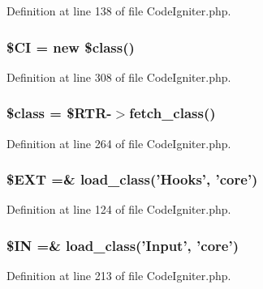 Definition at line 138 of file Code\-Igniter.\-php.

\subsubsection[{\$\-C\-I}]{\setlength{\rightskip}{0pt plus 5cm}\$C\-I = new \$class()}\label{_code_igniter_8php_ae0314d046ddf7fcfaec03222977427d3}


Definition at line 308 of file Code\-Igniter.\-php.

\subsubsection[{\$class}]{\setlength{\rightskip}{0pt plus 5cm}\$class = \$R\-T\-R-\/$>$fetch\-\_\-class()}\label{_code_igniter_8php_a252ba022809910ea710a068fc1bab657}


Definition at line 264 of file Code\-Igniter.\-php.

\subsubsection[{\$\-E\-X\-T}]{\setlength{\rightskip}{0pt plus 5cm}\${\bf E\-X\-T} =\& load\-\_\-class('Hooks', 'core')}\label{_code_igniter_8php_ab97aae9bc0aae04b84d360a29a3c035b}


Definition at line 124 of file Code\-Igniter.\-php.

\subsubsection[{\$\-I\-N}]{\setlength{\rightskip}{0pt plus 5cm}\$I\-N =\& load\-\_\-class('Input', 'core')}\label{_code_igniter_8php_a66d076d48aff75a01bb726f5bdd94d46}


Definition at line 213 of file Code\-Igniter.\-php.

